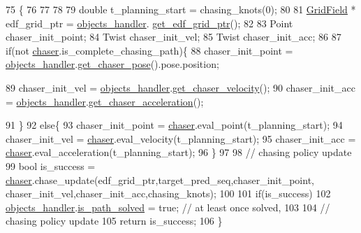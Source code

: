 \begin{DoxyCode}
75                                                                                    \{
76   
77 
78 
79     \textcolor{keywordtype}{double} t\_planning\_start = chasing\_knots(0);
80 
81     \hyperlink{struct_grid_field}{GridField} * edf\_grid\_ptr = \hyperlink{class_wrapper_a8cddd5ffbaeb5ab0b5d8d8d0c74f810f}{objects\_handler}.
      \hyperlink{class_objects_handler_afe849882d1feeef8316a45632381da54}{get\_edf\_grid\_ptr}();
82 
83     Point chaser\_init\_point;
84     Twist chaser\_init\_vel; 
85     Twist chaser\_init\_acc;
86 
87     \textcolor{keywordflow}{if}(not \hyperlink{namespacechaser}{chaser}.is\_complete\_chasing\_path)\{    
88         chaser\_init\_point = \hyperlink{class_wrapper_a8cddd5ffbaeb5ab0b5d8d8d0c74f810f}{objects\_handler}.\hyperlink{class_objects_handler_a4ac7a7bb712575c2ff6ffbf37144cf56}{get\_chaser\_pose}().pose.position; 
         
89         chaser\_init\_vel = \hyperlink{class_wrapper_a8cddd5ffbaeb5ab0b5d8d8d0c74f810f}{objects\_handler}.\hyperlink{class_objects_handler_aa1af309b0e964ccb6df8dede045fa32b}{get\_chaser\_velocity}();
90         chaser\_init\_acc = \hyperlink{class_wrapper_a8cddd5ffbaeb5ab0b5d8d8d0c74f810f}{objects\_handler}.\hyperlink{class_objects_handler_a41d48832b07a4d4276147a99dd1d31bc}{get\_chaser\_acceleration}(); 
        
91     \}
92     \textcolor{keywordflow}{else}\{
93         chaser\_init\_point = \hyperlink{namespacechaser}{chaser}.eval\_point(t\_planning\_start);
94         chaser\_init\_vel = \hyperlink{namespacechaser}{chaser}.eval\_velocity(t\_planning\_start);
95         chaser\_init\_acc = \hyperlink{namespacechaser}{chaser}.eval\_acceleration(t\_planning\_start);
96     \}
97 
98     \textcolor{comment}{// chasing policy update }
99     \textcolor{keywordtype}{bool} is\_success = \hyperlink{namespacechaser}{chaser}.chase\_update(edf\_grid\_ptr,target\_pred\_seq,chaser\_init\_point,
      chaser\_init\_vel,chaser\_init\_acc,chasing\_knots);   
100 
101     \textcolor{keywordflow}{if}(is\_success) 
102         \hyperlink{class_wrapper_a8cddd5ffbaeb5ab0b5d8d8d0c74f810f}{objects\_handler}.\hyperlink{class_objects_handler_ad8d1ea6646024f0a03e154a7c2c07682}{is\_path\_solved} = \textcolor{keyword}{true}; \textcolor{comment}{// at least once solved, }
103 
104     \textcolor{comment}{// chasing policy update }
105     \textcolor{keywordflow}{return} is\_success;
106 \}
\end{DoxyCode}


